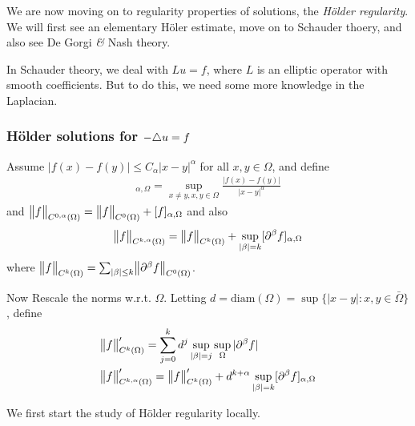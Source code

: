 \documentclass[12pt,a4paper]{article}
\begin{document}
We are now moving on to regularity properties of solutions, the \emph{H\"older regularity}. We will first see an elementary H\"oler estimate, move on to Schauder thoery, and also see De Gorgi \emph{\&} Nash theory.
\s

In Schauder theory, we deal with $Lu=f$, where $L$ is an elliptic operator with smooth coefficients. But to do this, we need some more knowledge in the Laplacian.
\s

\subsubsection*{H\"{o}lder solutions for $-\triangle u =f$}

 Assume $|f(x)-f(y)| \leq C_{\alpha} |x-y|^{\alpha}$ for all $x,y\in \Omega$, and define
\begin{align*}
[f]_{\alpha, \Omega} = \sup_{x\neq y, x,y\in \Omega} \frac{|f(x)-f(y)|}{|x-y|^{\alpha}}
\end{align*}
and $\bigl\lVert f\bigr\rVert_{C^{0,\alpha}(\Omega)} = \bigl\lVert f\bigr\rVert_{C^0(\Omega)} + [f]_{\alpha, \Omega}$ and also
\begin{align*}
\bigl\lVert f\bigr\rVert_{C^{k,\alpha}(\Omega)} = \bigl\lVert f\bigr\rVert_{C^k(\Omega)} + \sup_{|\beta|=k}[\partial^{\beta} f]_{\alpha, \Omega}
\end{align*}
where $\bigl\lVert f\bigr\rVert_{C^k(\Omega)} = \sum_{|\beta|\leq k} \bigl\lVert\partial^{\beta} f\bigr\rVert_{C^0(\Omega)}$.
\s

Now Rescale the norms w.r.t. $\Omega$. Letting $d= \text{diam}(\Omega) = \sup \{|x-y| : x,y\in \bar{\Omega}\}$, define
\begin{align*}
&\bigl\lVert f\bigr\rVert_{C^k(\Omega)}' = \sum_{j=0}^k d^j \sup_{|\beta|=j} \sup_{\Omega} |\partial^{\beta}f| \\
&\bigl\lVert f\bigr\rVert_{C^{k, \alpha}(\Omega)}' = \bigl\lVert f\bigr\rVert_{C^k(\Omega)}' + d^{k+\alpha}\sup_{|\beta|=k}[\partial^{\beta}f]_{\alpha, \Omega}
\end{align*}
\s

We first start the study of H\"{o}lder regularity locally.
\s
\end{document}
